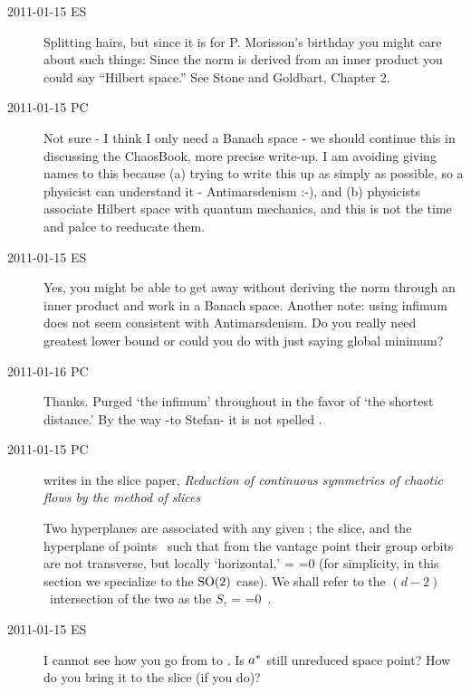 \begin{description}
\item[2011-01-15 ES]
Splitting hairs, but since it is for P. Morisson's birthday you might
care about such things: Since the norm is derived from an inner product you
could say ``Hilbert space.'' See Stone and Goldbart, Chapter 2.

\item[2011-01-15 PC]
Not sure - I think I only need a Banach space - we should continue this in
discussing the ChaosBook, more precise write-up. I am avoiding giving names to
this because (a) trying to write this up as simply as possible, so a physicist can
understand it - Antimarsdenism :-), and (b) physicists associate Hilbert space
with quantum mechanics, and this is not the time and palce to reeducate them.

\item[2011-01-15 ES]
Yes, you might be able to get away without deriving the norm through an
inner product and work in a Banach space. Another note: using infimum
does not seem consistent with Antimarsdenism. Do you really need greatest
lower bound or could you do with just saying global minimum?

\item[2011-01-16 PC] Thanks. Purged `the infimum' throughout in the favor of
`the shortest distance.' By the way -to Stefan- it is not spelled
.

\item[2011-01-15 PC] writes in the slice paper,
{\emph{Reduction of continuous symmetries}} \emph{of chaotic flows by the
method of slices}

Two
hyperplanes are associated with  any given {\template} \slicep; the slice,
and the hyperplane of points \sspSing\ such that from
the {\template} vantage point their group orbits are not transverse, but
locally `horizontal,'
\beq
\braket{\groupTan(\sspSing)}{\sliceTan{}}
 =
\braket{\sspSing}{\Lg^2\slicep}
 =0
(for simplicity, in this section we specialize to the  $\textrm{SO}(2)$ case).
We shall refer to the $(d\!-\!2)$\dmn\ intersection of the two as the
{\em \sset} $S$,
\beq
\braket{\groupTan(\sspRSing)}{\sliceTan{}}
 =
\braket{\sspRSing}{\Lg^2\slicep}
 =0
\,.


\item[2011-01-15 ES]
I cannot see how you go from  to .
Is $a^*$ still unreduced space point? How do you bring it to the
slice (if you do)?


\end{description}
